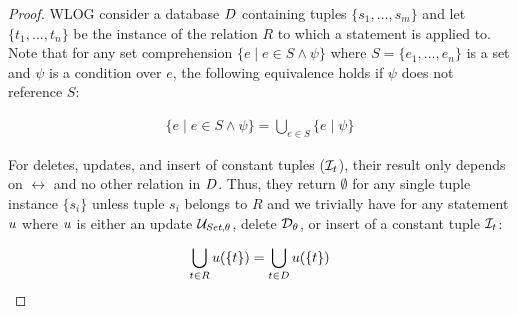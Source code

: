   \begin{proof}
    WLOG consider a database $D$ containing tuples $\{s_1, \ldots, s_m\}$ and let $\{t_1, \ldots, t_n\}$ be the instance of the relation $R$ to which a statement is applied to. Note that for any set comprehension $\{ e \mid e \in S \land \psi \}$ where $S = \{e_1, \ldots, e_n\}$ is a set and $\psi$ is a condition over $e$, the following equivalence holds if $\psi$ does not reference $S$:

    \begin{align}
      \label{eq:factor-comprehensions}
      \{ e \mid e \in S \land \psi \} = \bigcup_{e \in S} \{ e \mid \psi \}
    \end{align}

    For deletes, updates, and insert of constant tuples ($\mathcal{I}_{t}$), their result only depends on $\rel$ and no other relation in $D$. Thus, they return $\emptyset$ for any single tuple instance $\{ s_i\}$ unless tuple $s_i$ belongs to $R$ and we trivially have for any statement $u$ where $u$ is either an update $\mathcal{U}_{\textit{Set},\theta}$, delete $\mathcal{D}_{\theta}$, or insert of a constant tuple $\mathcal{I}_{t}$:

    \begin{align}
      \label{eq:rel-update-same-as-database-update}
      \bigcup_{t \in R}  u(\{t\}) = \bigcup_{t \in D} u(\{t\})
    \end{align}


\end{proof}

